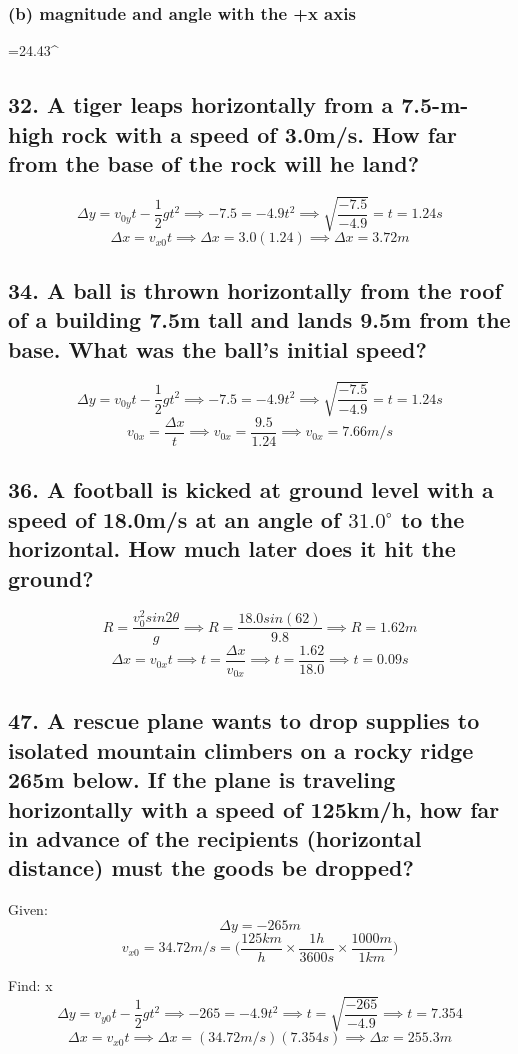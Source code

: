 \documentclass[12pt,a4paper,english]{article}
\newcommand{\degree}[1]{${#1}^\circ$}
\begin{document}
\begin{flushleft}
  \subsubsection{(b) magnitude and angle with the +x axis}
  =24.43^\circ
  \subsection{32. A tiger leaps horizontally from a 7.5-m-high rock with a speed of 3.0m/s. How far from the base of the rock will he land?}
  \[
    \Delta y=v_{0y}t-\frac{1}{2}gt^2 \implies -7.5=-4.9t^2\implies
    \sqrt{\frac{-7.5}{-4.9}}=t=1.24s
  \]
  \[
    \Delta x =v_{x0}t\implies
    \Delta x=3.0(1.24)\implies
    \Delta x=3.72m
  \]
  \subsection{34. A ball is thrown horizontally from the roof of a building 7.5m tall and lands 9.5m from the base. What was the ball's initial speed?}
  \[
    \Delta y=v_{0y}t-\frac{1}{2}gt^2 \implies 
    -7.5=-4.9t^2\implies
    \sqrt{\frac{-7.5}{-4.9}}=t=1.24s
  \]
  \[
  v_{0x}=\frac{\Delta x}{t}\implies
  v_{0x}=\frac{9.5}{1.24}\implies
  v_{0x}=7.66m/s
  \]
  \subsection{36. A football is kicked at ground level with a speed of 18.0m/s at an angle of \degree{31.0} to the horizontal. How much later does it hit the ground?}
\[
  R=\frac{v_0^2sin2\theta}{g}\implies
  R=\frac{18.0sin(62)}{9.8}\implies
  R=1.62m
\]
\[
  \Delta x=v_{0x}t\implies
  t=\frac{\Delta x}{v_{0x}}\implies
  t=\frac{1.62}{18.0}\implies
  t=0.09s
\]
  \subsection{47. A rescue plane wants to drop supplies to isolated mountain climbers on a rocky ridge 265m below. If the plane is traveling horizontally with a speed of 125km/h, how far in advance of the recipients (horizontal distance) must the goods be dropped?}
  Given:
\[
  \Delta y = -265m
\]
  \[
  v_{x0} =34.72m/s=\biggr( \frac{125km}{h} \times \frac{1h}{3600s}\times \frac{1000m}{1km}\biggr)
\]

Find: \Delta x\\
\[
  \Delta y=v_{y0}t-\frac{1}{2}gt^2\implies
  -265=-4.9t^2\implies
  t=\sqrt{\frac{-265}{-4.9}}\implies
  t=7.354
\]
\[
  \Delta x=v_{x0}t\implies
  \Delta x=(34.72m/s)(7.354s)\implies
  \Delta x=255.3m
\]
\end{flushleft}
\end{document}
